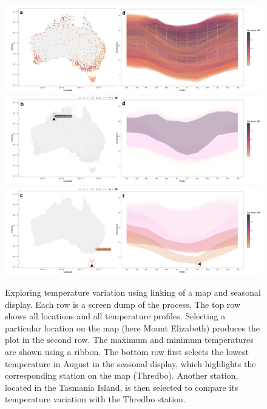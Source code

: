 \documentclass[
  shortnames]{jss}
\begin{document}
\begin{CodeChunk}
\begin{figure}

{\centering \includegraphics[width=1\linewidth,height=0.23\textheight]{figures/linking} \includegraphics[width=1\linewidth,height=0.23\textheight]{figures/linking-north} \includegraphics[width=1\linewidth,height=0.23\textheight]{figures/linking-lower} 

}

\caption[Exploring temperature variation using linking of a map and seasonal display]{Exploring temperature variation using linking of a map and seasonal display. Each row is a screen dump of the process. The top row shows all locations and all temperature profiles. Selecting a particular location on the map (here Mount Elizabeth) produces the plot in the second row. The maximum and minimum temperatures are shown using a ribbon. The bottom row first selects the lowest temperature in August in the seasonal display, which highlights the corresponding station on the map (Thredbo). Another  station, located in the Tasmania Island, is then selected to compare its temperature variation with the Thredbo station.}\label{fig:interactive-linking}
\end{figure}
\end{CodeChunk}
\end{document}
